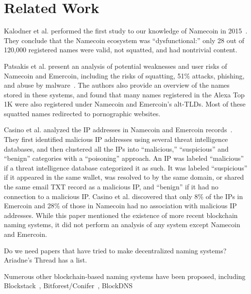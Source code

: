 \section{Related Work}

Kalodner et al. performed the first study to our knowledge of 
Namecoin in 2015~\cite{kalodner_namecoin_2015}. They conclude 
that the Namecoin ecosystem was ``dysfunctional:'' only 28 
out of 120,000 registered names were valid, not squatted, and 
had nontrivial content.

Patsakis et al. present an analysis of potential weaknesses 
and user risks of 
Namecoin and Emercoin, including the risks of squatting, 51\% 
attacks, phishing, and abuse by 
malware~\cite{patsakis_unravelling_2020}. The authors also 
provide an overview of the names stored in these systems, and 
found that many names registered in the Alexa Top 1K were 
also registered under Namecoin and Emercoin's alt-TLDs. Most 
of these squatted names redirected to pornographic websites.

Casino et al. analyzed the IP addresses in Namecoin and 
Emercoin records~\cite{casino_unearthing_2021}. They first 
identified malicious IP addresses using several threat 
intelligence databases, and then clustered all the IPs into 
``malicious,'' ``suspicious'' and ``benign'' categories with 
a ``poisoning'' 
approach. An IP was labeled ``malicious'' if a threat 
intelligence database categorized it as such. It was labeled 
``suspicious'' if it appeared in the same wallet, was 
resolved to by the same domain, or shared the same email TXT 
record as a malicious IP, and ``benign'' if it had no 
connection to a malicious IP. Casino et al. discovered that 
only 8\% of the IPs in Emercoin and 28\% of those in Namecoin 
had no association with malicious IP addresses. While this 
paper mentioned the existence of more recent blockchain 
naming systems, it did not perform an analysis of any system 
except Namecoin and Emercoin.

Do we need papers that have tried to make decentralized 
naming systems? 
Ariadne's Thread has a list.

Numerous other blockchain-based naming systems have been 
proposed, including
Blockstack~\cite{ali2016blockstack}, 
Bitforest/Conifer~\cite{dong2018bitforest, dong2018conifer}, 
BlockDNS~\cite{blockdns}
